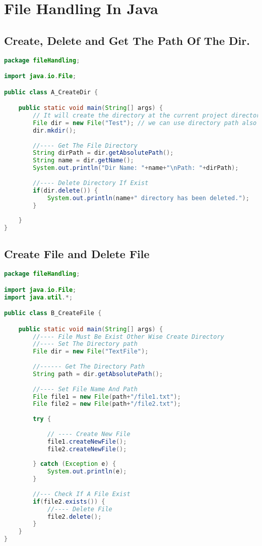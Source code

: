 \chapter{File Handling In Java}

\section{Create, Delete and Get The Path Of The Dir.}
\begin{lstlisting}[language=java]
package fileHandling;

import java.io.File;

public class A_CreateDir {

	public static void main(String[] args) {
		// It will create the directory at the current project directory.
		File dir = new File("Test"); // we can use directory path also
		dir.mkdir();
		
		//---- Get The File Directory
		String dirPath = dir.getAbsolutePath();
		String name = dir.getName();
		System.out.println("Dir Name: "+name+"\nPath: "+dirPath);
		
		//---- Delete Directory If Exist
		if(dir.delete()) {
			System.out.println(name+" directory has been deleted.");
		}
		
	}
}

\end{lstlisting}


\newpage
\section{Create File and Delete File}
\begin{lstlisting}[language=java]
package fileHandling;

import java.io.File;
import java.util.*;

public class B_CreateFile {

	public static void main(String[] args) {
		//---- File Must Be Exist Other Wise Create Directory
		//---- Set The Directory path
		File dir = new File("TextFile");
		
		//------ Get The Directory Path
		String path = dir.getAbsolutePath();
		
		//---- Set File Name And Path
		File file1 = new File(path+"/file1.txt");
		File file2 = new File(path+"/file2.txt");
		
		try {
			
			// ---- Create New File
			file1.createNewFile();
			file2.createNewFile();
			
		} catch (Exception e) {
			System.out.println(e);
		}
		
		//--- Check If A File Exist
		if(file2.exists()) {
			//---- Delete File
			file2.delete();
		}
	}
}

\end{lstlisting}


